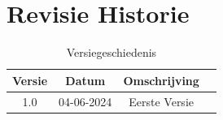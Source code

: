\documentclass{article}
\begin{document}
  \tableofcontents
  \pagebreak 

  \section{Revisie Historie}
  \begin{table}[h]
      \centering
      \begin{tabular}{|c|c|c|p{5cm}|}
          \hline
          \textbf{Versie} & \textbf{Datum} & \textbf{Omschrijving}  \\
          \hline
          1.0  & 04-06-2024 & Eerste Versie \\
          \hline
  
      \end{tabular}
      \caption{Versiegeschiedenis}
  \end{table}
  \pagebreak
\end{document}
